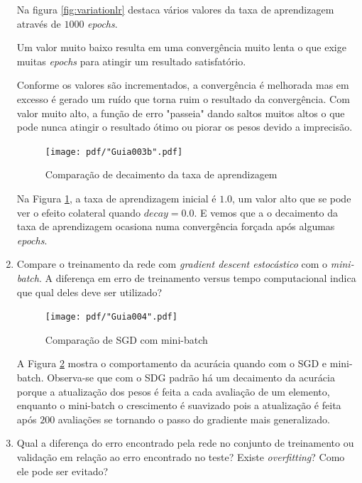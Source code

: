 \begin{enumerate}
    Na figura \ref{fig:variationlr} destaca vários valores da taxa de aprendizagem através de $1000$ \textit{epochs}.
    
    Um valor muito baixo resulta em uma convergência muito lenta o que exige muitas \textit{epochs} para atingir um resultado satisfatório.
    
    Conforme os valores são incrementados, a convergência é melhorada mas em excesso é gerado um ruído que torna ruim o resultado da convergência. Com valor muito alto, a função de erro "passeia" dando saltos muitos altos o que pode nunca atingir o resultado ótimo ou piorar os pesos devido a imprecisão.
    
    \begin{figure}[H]
        \centering
        \texttt{[image: pdf/"Guia003b".pdf]}
        \caption{Comparação de decaimento da taxa de aprendizagem}
        \label{fig:decaylr}
    \end{figure}
    
    Na Figura \ref{fig:decaylr}, a taxa de aprendizagem inicial é $1.0$, um valor alto que se pode ver o efeito colateral quando $decay = 0.0$. E vemos que a o decaimento da taxa de aprendizagem ocasiona numa convergência forçada após algumas \textit{epochs}.
    
    \newpage
    \item Compare o treinamento da rede com \textit{gradient descent estocástico} com o \textit{mini-batch}.
    A diferença em erro de treinamento versus tempo computacional indica que qual deles deve ser utilizado?
    
    \begin{figure}[H]
        \centering
        \texttt{[image: pdf/"Guia004".pdf]}
        \caption{Comparação de SGD com mini-batch}
        \label{fig:compsgdminibat}
    \end{figure}
    
    A Figura \ref{fig:compsgdminibat} mostra o comportamento da acurácia quando com o SGD e mini-batch. Observa-se que com o SDG padrão há um decaimento da acurácia porque a atualização dos pesos é feita a cada avaliação de um elemento, enquanto o mini-batch o crescimento é suavizado pois a atualização é feita após $200$ avaliações se tornando o passo do gradiente mais generalizado.
    
    \newpage
    \item Qual a diferença do erro encontrado pela rede no conjunto de treinamento ou validação em relação ao erro encontrado no teste? Existe \textit{overfitting}? Como ele pode ser evitado?
    

\end{enumerate}
